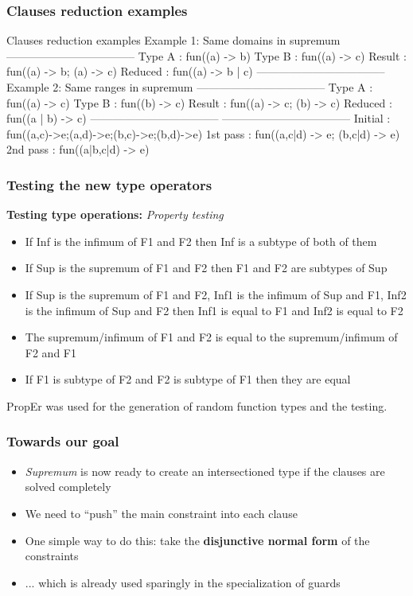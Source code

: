 \documentclass{beamer}
\begin{document}
\begin{frame}[fragile]
  \frametitle{Clauses reduction examples}
\begin{code}{Clauses reduction examples}
  Example 1: Same domains in supremum
  -----------------------------------
  Type A  : fun((a) -> b)
  Type B  : fun((a) -> c)
  Result  : fun((a) -> b; (a) -> c)
  Reduced : fun((a) -> b | c)
  -----------------------------------
  Example 2: Same ranges in supremum
  -----------------------------------
  Type A  : fun((a) -> c)
  Type B  : fun((b) -> c)
  Result  : fun((a) -> c; (b) -> c)
  Reduced : fun((a | b) -> c)
  -----------------------------------
  -----------------------------------
  Initial  : fun((a,c)->e;(a,d)->e;(b,c)->e;(b,d)->e)
  1st pass : fun((a,c|d) -> e; (b,c|d) -> e)
  2nd pass : fun((a|b,c|d) -> e)
\end{code}
\end{frame}

\begin{frame}
  \frametitle{Testing the new type operators}
  \textbf{Testing type operations:} \emph{Property testing}
  \begin{itemize}
    \footnotesize
  \item If Inf is the infimum of F1 and F2 then Inf is a subtype of
    both of them
  \item If Sup is the supremum of F1 and F2 then F1 and F2 are
    subtypes of Sup
  \item If Sup is the supremum of F1 and F2, Inf1 is the infimum of
    Sup and F1, Inf2 is the infimum of Sup and F2 then Inf1 is equal
    to F1 and Inf2 is equal to F2
  \item The supremum/infimum of F1 and F2 is equal to the
    supremum/infimum of F2 and F1
  \item If F1 is subtype of F2 and F2 is subtype of F1 then they are
    equal
  \end{itemize}
  PropEr was used for the generation of random function types and the
  testing.
\end{frame}

\begin{frame}
  \frametitle{Towards our goal}
  \begin{itemize}
    \item \emph{Supremum} is now ready to create an intersectioned
      type if the clauses are solved completely
    \item We need to ``push'' the main constraint into each clause
      \pause
    \item One simple way to do this: take the \textbf{disjunctive
      normal form} of the constraints
    \item ... which is already used sparingly in the specialization of
      guards
  \end{itemize}
\end{frame}
\end{document}
